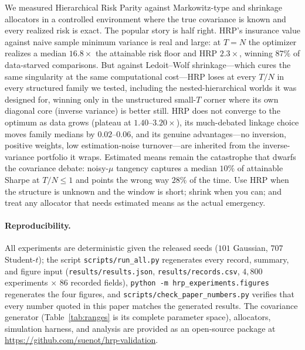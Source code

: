 \documentclass[11pt]{article}
\newcommand{\TN}{T/N}
\begin{document}
We measured Hierarchical Risk Parity against Markowitz-type and shrinkage
allocators in a controlled environment where the true covariance is known
and every realized risk is exact. The popular story is half right. HRP's
insurance value against naive sample minimum variance is real and large: at
$T=N$ the optimizer realizes a median $16.8\times$ the attainable risk
floor and HRP $2.3\times$, winning $87\%$ of data-starved comparisons. But
against Ledoit--Wolf shrinkage---which cures the same singularity at the
same computational cost---HRP loses at every $\TN$ in every structured
family we tested, including the nested-hierarchical worlds it was designed
for, winning only in the unstructured small-$T$ corner where its own
diagonal core (inverse variance) is better still. HRP does not converge to
the optimum as data grows (plateau at $1.40$--$3.20\times$), its
much-debated linkage choice moves family medians by $0.02$--$0.06$, and its
genuine advantages---no inversion, positive weights, low estimation-noise
turnover---are inherited from the inverse-variance portfolio it wraps.
Estimated means remain the catastrophe that dwarfs the covariance debate:
noisy-$\mu$ tangency captures a median $10\%$ of attainable Sharpe at
$\TN\le1$ and points the wrong way $28\%$ of the time. Use HRP when the
structure is unknown and the window is short; shrink when you can; and
treat any allocator that needs estimated means as the actual emergency.

\paragraph{Reproducibility.} All experiments are deterministic given the
released seeds ($101$ Gaussian, $707$ Student-$t$); the script
\texttt{scripts/run\_all.py} regenerates every record, summary, and figure
input (\texttt{results/results.json}, \texttt{results/records.csv}, $4{,}800$
experiments $\times$ $86$ recorded fields), \texttt{python -m
hrp\_experiments.figures} regenerates the four figures, and
\texttt{scripts/check\_paper\_numbers.py} verifies that every number quoted
in this paper matches the generated results. The covariance generator
(Table~\ref{tab:ranges} is its complete parameter space), allocators,
simulation harness, and analysis are provided as an open-source package at
\url{https://github.com/suenot/hrp-validation}.

\small


\end{document}
